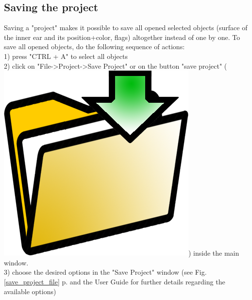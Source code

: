 \documentclass[12pt, a4paper]{book}
\begin{document}
\subsection{Saving the project}
Saving a "project" makes it possible to save all opened selected objects (surface of the inner ear and its position+color, flags) altogether instead of one by one. 
To save all opened objects, do the following sequence of actions:\\
1) press "CTRL + A" to select all objects\\
2) click on "File->Project->Save Project" or on the button "save project" (\includegraphics[scale=0.03]{../images/03/save_data.png})  inside the main window.\\
3) choose the desired options in the "Save Project" window (see Fig. \ref{save_project_file} p.\pageref{save_project_file} and the User Guide for further details regarding the available options)
\end{document}
